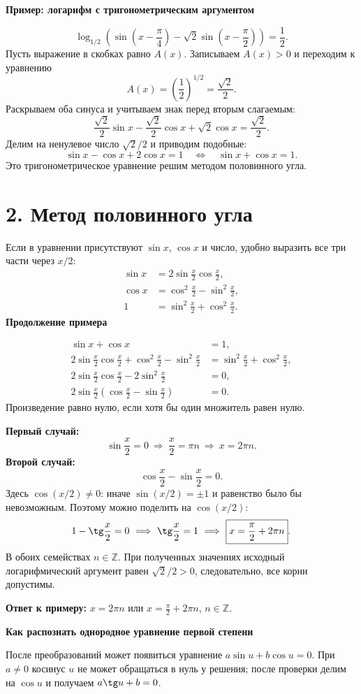 \documentclass[a4paper,12pt]{article}
\newcommand{\key}[1]{\textcolor{darkaccent}{\textbf{#1}}}
\newcommand{\sub}[1]{\vspace{.45em}\noindent\textcolor{darkaccent}{\bfseries #1}\par\smallskip}
\newcommand{\sect}[1]{\section*{\color{darkaccent}#1}}
\begin{document}
\sub{Пример: логарифм с тригонометрическим аргументом}
\[
\log_{1/2}\!\left(\sin\left(x-\frac\pi4\right)
-\sqrt2\sin\left(x-\frac\pi2\right)\right)=\frac12.
\]
Пусть выражение в скобках равно $A(x)$. Записываем $A(x)>0$ и переходим к уравнению
\[
A(x)=\left(\frac12\right)^{1/2}=\frac{\sqrt2}{2}.
\]
Раскрываем оба синуса и учитываем знак перед вторым слагаемым:
\[
\frac{\sqrt2}{2}\sin x-\frac{\sqrt2}{2}\cos x
+\sqrt2\cos x=\frac{\sqrt2}{2}.
\]
Делим на ненулевое число $\sqrt2/2$ и приводим подобные:
\[
\sin x-\cos x+2\cos x=1
\quad\Longleftrightarrow\quad\boxed{\sin x+\cos x=1}.
\]
Это тригонометрическое уравнение решим методом половинного угла.

\clearpage
\sect{2. Метод половинного угла}
Если в уравнении присутствуют $\sin x$, $\cos x$ и число, удобно выразить все три части через $x/2$:
\[
\begin{aligned}
\sin x&=2\sin\frac x2\cos\frac x2,\\
\cos x&=\cos^2\frac x2-\sin^2\frac x2,\\
1&=\sin^2\frac x2+\cos^2\frac x2.
\end{aligned}
\]
\sub{Продолжение примера}
\[
\begin{aligned}
\sin x+\cos x&=1,\\
2\sin\frac x2\cos\frac x2+\cos^2\frac x2-\sin^2\frac x2
&=\sin^2\frac x2+\cos^2\frac x2,\\
2\sin\frac x2\cos\frac x2-2\sin^2\frac x2&=0,\\
2\sin\frac x2\left(\cos\frac x2-\sin\frac x2\right)&=0.
\end{aligned}
\]
Произведение равно нулю, если хотя бы один множитель равен нулю.

\textbf{Первый случай:}
\[
\sin\frac x2=0\ \Longrightarrow\ \frac x2=\pi n
\ \Longrightarrow\ \boxed{x=2\pi n}.
\]
\textbf{Второй случай:}
\[
\cos\frac x2-\sin\frac x2=0.
\]
Здесь $\cos(x/2)\ne0$: иначе $\sin(x/2)=\pm1$ и равенство было бы невозможным. Поэтому можно поделить на $\cos(x/2)$:
\[
1-\tg\frac x2=0
\ \Longrightarrow\ \tg\frac x2=1
\ \Longrightarrow\ \boxed{x=\frac\pi2+2\pi n}.
\]
В обоих семействах $n\in\mathbb Z$. При полученных значениях исходный логарифмический аргумент равен $\sqrt2/2>0$, следовательно, все корни допустимы.

\key{Ответ к примеру:}
$\displaystyle x=2\pi n$ или
$\displaystyle x=\frac\pi2+2\pi n$, $n\in\mathbb Z$.

\sub{Как распознать однородное уравнение первой степени}
После преобразований может появиться уравнение $a\sin u+b\cos u=0$. При $a\ne0$ косинус $u$ не может обращаться в нуль у решения; после проверки делим на $\cos u$ и получаем $a\tg u+b=0$.
\end{document}
